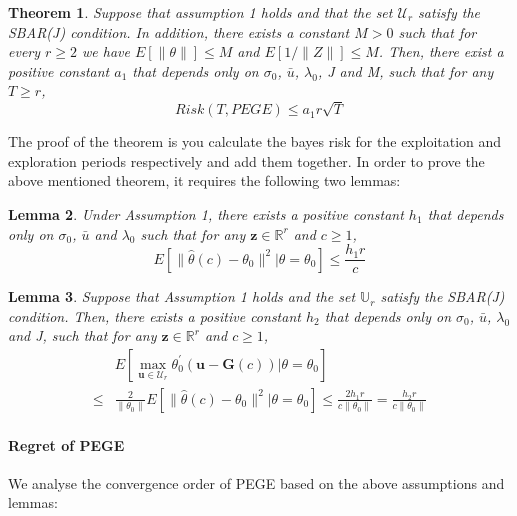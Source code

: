 \documentclass{article}
\newtheorem{theorem}{Theorem}
\newtheorem{lemma}[theorem]{Lemma}
\theoremstyle{plain}
\theoremstyle{definition}
\begin{document}
\begin{theorem}
Suppose that assumption 1 holds and that the set $\mathcal{U}_{r}$ satisfy the SBAR(J) condition. In addition, there exists a constant $M>0$ such that for every $r\geq 2$ we have $E[\|\theta\|]\leq M$ and $E[1/\|Z\|]\leq M$. Then, there exist a positive constant $a_{1}$ that depends only on $\sigma_{0}$, $\bar{u}$, $\lambda_{0}$, J and M, such that for any $T\geq r$,
\begin{equation}
Risk(T,PEGE)\leq a_{1}r\sqrt{T} \nonumber 
\end{equation}

\end{theorem}

The proof of the theorem is you calculate the bayes risk for the exploitation and exploration periods respectively and add them together. In order to prove the above mentioned theorem, it requires the following two lemmas:
\begin{lemma}
Under Assumption 1, there exists a positive constant $h_{1}$ that depends only on $\sigma_{0}$, $\bar{u}$ and $\lambda_{0}$ such that for any $\textbf{z}\in \mathbb{R}^{r}$ and $c\geq 1$,
\begin{equation}
E\left[\|\hat{\theta}(c)-\theta_{0}\|^{2}|\theta=\theta_{0}\right]\leq \frac{h_{1}r}{c} 
\end{equation} 
\end{lemma}

\begin{lemma}
Suppose that Assumption 1 holds and the set $\mathbb{U}_{r}$ satisfy the SBAR(J) condition. Then, there exists a positive constant $h_{2}$ that depends only on $\sigma_{0}$, $\bar{u}$, $\lambda_{0}$ and J, such that for any $\textbf{z}\in \mathbb{R}^{r}$ and $c\geq 1$,
\begin{align}
&E \left[ \max_{\textbf{u}\in \mathcal{U}_{r}} \theta_{0}^{'}(\textbf{u}-\textbf{G}(c))|\theta=\theta_{0}\right] \nonumber \\
\leq & \frac{2}{\|\theta_0\|}E\left[\|\hat{\theta}(c)-\theta_{0}\|^{2}|\theta=\theta_{0}\right]\leq
\frac{2h_{1}r}{c\|\theta_{0}\|} =\frac{h_2r}{c\|\theta_0\|}
\end{align}
\end{lemma}


\paragraph{Regret of PEGE}
We analyse the convergence order of PEGE based on the above assumptions and lemmas:
\end{document}
